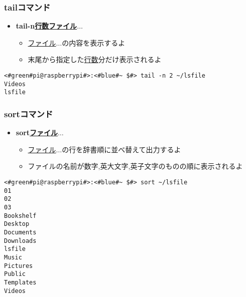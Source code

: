 \begin{frame}[fragile]
    \frametitle{tailコマンド}
    \begin{itemize}
        \item {\bf tail\textvisiblespace -n\textvisiblespace\underline{行数}\textvisiblespace\underline{ファイル}$\ldots$}
        \begin{itemize}
            \small
            \item[] \underline{ファイル}$\ldots$の内容を表示するよ
            \item[] 末尾から指定した\underline{行数}分だけ表示されるよ
        \end{itemize}
    \end{itemize}
    \begin{lstlisting}[title=tailコマンドの実行例, label=tail_example]
<#green#pi@raspberrypi#>:<#blue#~ $#> tail -n 2 ~/lsfile
Videos
lsfile
    \end{lstlisting}
\end{frame}

\begin{frame}[fragile]
    \frametitle{sortコマンド}
    \begin{itemize}
        \item {\bf sort\textvisiblespace\underline{ファイル}$\ldots$}
        \begin{itemize}
            \small
            \item[] \underline{ファイル}$\ldots$の行を辞書順に並べ替えて出力するよ
            \item[] ファイルの名前が数字,英大文字,英子文字のものの順に表示されるよ
    \end{itemize}
\end{itemize}
\begin{lstlisting}[title=sortコマンドの実行例, label=sort_example]
<#green#pi@raspberrypi#>:<#blue#~ $#> sort ~/lsfile
01
02
03
Bookshelf
Desktop
Documents
Downloads
lsfile
Music
Pictures
Public
Templates
Videos
    \end{lstlisting}
\end{frame}

